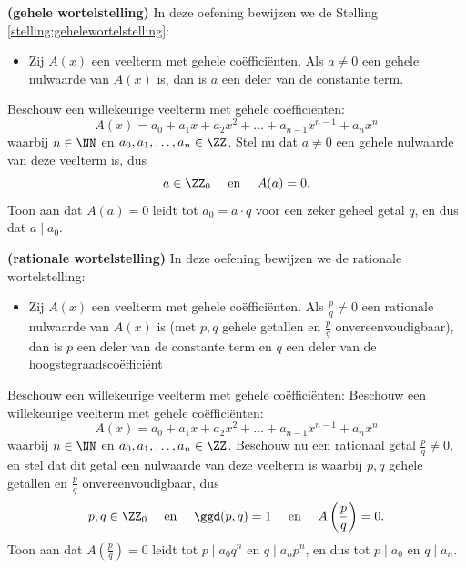 \documentclass{ximera}
\begin{document}
\begin{Uitbreiding}
\begin{Oefening}\label{oefening:gehelewortelstelling}
{\bf (gehele wortelstelling)} 
In deze oefening bewijzen we de Stelling \ref{stelling:gehelewortelstelling}: 
\begin{itemize}
\item[]
Zij $A(x)$ een veelterm met gehele co\"effici\"enten. Als $a \neq 0$ een gehele nulwaarde van $A(x)$ is, dan is $a$ een deler van de constante term.
\end{itemize}
Beschouw een willekeurige veelterm met gehele co\"effici\"enten:
\[
A(x) = a_0 + a_1 x + a_2 x^2 + \dots + a_{n-1} x^{n-1} + a_nx^n
\]
waarbij $ n \in \NN$ en $a_0, a_1, \ldots, a_n \in \ZZ$. Stel nu dat $a \neq 0$ een gehele nulwaarde van deze veelterm is, dus
\[
a \in \ZZ_0 \quad \text{ en } \quad A(a) = 0.
\]
Toon aan dat $A(a) = 0$ leidt tot $a_0 = a\cdot q$ voor een zeker geheel getal $q$, en dus dat $a \mid a_0$. 
\end{Oefening}
\end{Uitbreiding}


\begin{Uitbreiding}
\begin{Oefening}\label{oefening:rationalewortelstelling}
{\bf (rationale wortelstelling)} 
In deze oefening bewijzen we de rationale wortelstelling:
\begin{itemize}
\item[]
Zij $A(x)$ een veelterm met gehele co\"effici\"enten. Als $\frac{p}{q} \neq 0$ een rationale nulwaarde van $A(x)$ is (met $p,q$ gehele getallen en $\frac{p}{q}$ onvereenvoudigbaar), dan is $p$ een deler van de constante term en $q$ een deler van de hoogstegraadsco\"effici\"ent  
\end{itemize}
Beschouw een willekeurige veelterm met gehele co\"effici\"enten:
Beschouw een willekeurige veelterm met gehele co\"effici\"enten:
\[
A(x) = a_0 + a_1 x + a_2 x^2 + \dots + a_{n-1} x^{n-1} + a_nx^n
\]
waarbij $ n \in \NN$ en $a_0, a_1, \ldots, a_n \in \ZZ$. Beschouw nu een rationaal getal $\frac{p}{q} \neq 0$, en stel dat dit getal een nulwaarde van deze veelterm is waarbij $p,q$ gehele getallen en $\frac{p}{q}$ onvereenvoudigbaar, dus
\[
p,q \in \ZZ_0 \quad \text{ en } \quad \ggd(p,q)=1 \quad \text{ en } \quad A\left(\frac{p}{q}\right) = 0.
\]
Toon aan dat $A\left(\frac{p}{q}\right) = 0$ leidt tot $p \mid a_0q^n$ en $q \mid a_n p^n$, en dus tot $p \mid a_0$ en $q \mid a_n$.
\end{Oefening}
\end{Uitbreiding}
\end{document}
